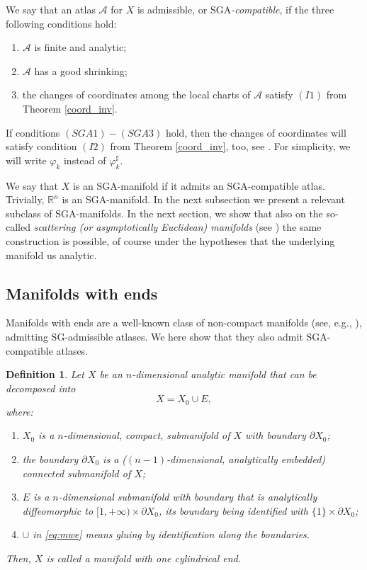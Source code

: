 \documentclass[11pt,reqno]{amsart}
\numberwithin{equation}{section}
\newtheorem{definition}[theorem]{Definition}
\newcommand{\R}{{\mathbb{R}}} %
\newcommand{\SG}{{\mathrm{SG}}}
\begin{document}
We say that an atlas $\mathscr{A}$ for $X$ is admissible, or \textit{$\mathrm{SGA}$-compatible}, if the three following conditions hold:
\begin{enumerate}
	\item[$(SGA1)$] $\mathscr{A}$ is finite and analytic;
	\item[$(SGA2)$] $\mathscr{A}$ has a good shrinking;
	\item[$(SGA3)$] the changes of coordinates among the local charts of $\mathscr{A}$ satisfy $(I1)$ from Theorem \ref{coord_inv}.
\end{enumerate}

If conditions $(SGA1)-(SGA3)$ hold, then the changes of coordinates will satisfy condition $(I2)$ from Theorem \ref{coord_inv}, too, 
see \cite[Lemma 3.3]{Schrohe86}. For simplicity, we will write $\varphi_k$ instead of $\varphi_k^\sharp$.

We say that $X$ is an SGA-manifold if it admits an $\mathrm{SGA}$-compatible atlas. Trivially, $\R^n$ is an SGA-manifold. 
In the next subsection we present a relevant subclass of SGA-manifolds. In the next section, we show that also on the so-called
\textit{scattering (or asymptotically Euclidean) manifolds} (see \cite{Melrose_GST}) the same construction is possible, of course
under the hypotheses that the underlying manifold us analytic.

\subsection{Manifolds with ends}\label{subs:mwe}
Manifolds with ends are a well-known class of non-compact manifolds (see, e.g., \cite{Melrose_APS,Melrose_GST,MP2002,Schrohe86}), admitting 
$\SG$-admissible atlases. We here show that they also admit SGA-compatible atlases.

\begin{definition}\label{def_mfwe}
	Let $X$ be an $n$-dimensional analytic manifold that can be decomposed into
	\begin{equation}\label{eq:mwe}
		X=X_0\cup E,
	\end{equation}
	where:
	\begin{enumerate}
		\item $X_0$ is a $n$-dimensional, compact, submanifold of $X$ with boundary $\partial X_0$;
		
		\item the boundary $\partial X_0$ is a ($(n-1)$-dimensional, analytically embedded) connected submanifold of $X$;
		
		\item $E$ is a $n$-dimensional submanifold with boundary that is analytically diffeomorphic to $[1,+\infty)\times \partial X_0$,
		its boundary being identified with $\{1\}\times\partial X_0$;
		
		\item $\cup$ in \eqref{eq:mwe} means gluing by identification along the boundaries.
	\end{enumerate}
	
	Then, $X$ is called a manifold with one cylindrical end.
\end{definition}
\end{document}
